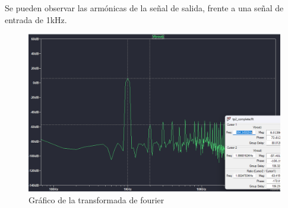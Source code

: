 Se pueden observar las armónicas de la señal de salida, frente a una señal de entrada de 1kHz.
\begin{figure}[h!]
    \centering
    \includegraphics[width=0.80\linewidth]{img/ftt1a.png}
    \caption{Gráfico de la transformada de fourier}
    \label{fig:fft1a}
\end{figure}
